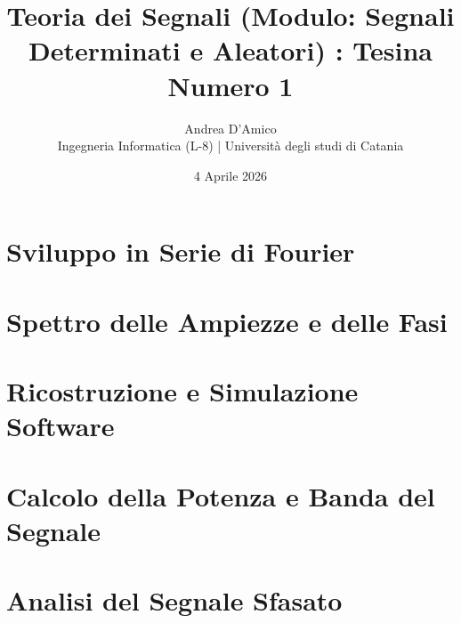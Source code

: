 \documentclass[11pt,a4paper]{article}
\title{
    \textbf{Teoria dei Segnali (Modulo: Segnali Determinati e Aleatori)
    : Tesina Numero 1
}}
\author{Andrea D'Amico \\ \small{Ingegneria Informatica (L-8) | Università degli studi di Catania}}
\date{4 Aprile 2026}
\begin{document}
\maketitle

\tableofcontents

\newpage


\newpage

\section{Sviluppo in Serie di Fourier}

\newpage

\section{Spettro delle Ampiezze e delle Fasi}

\newpage

\section{Ricostruzione e Simulazione Software}

\newpage

\section{Calcolo della Potenza e Banda del Segnale}

\newpage

\section{Analisi del Segnale Sfasato}



\end{document}
